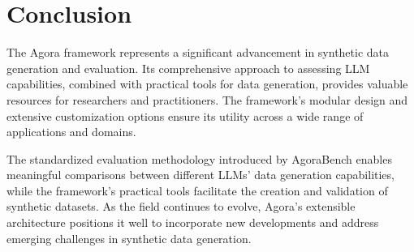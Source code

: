 \documentclass[10pt,conference]{IEEEtran}
\begin{document}
\section{Conclusion}
The Agora framework represents a significant advancement in synthetic data generation and evaluation. Its comprehensive approach to assessing LLM capabilities, combined with practical tools for data generation, provides valuable resources for researchers and practitioners. The framework's modular design and extensive customization options ensure its utility across a wide range of applications and domains.

The standardized evaluation methodology introduced by AgoraBench enables meaningful comparisons between different LLMs' data generation capabilities, while the framework's practical tools facilitate the creation and validation of synthetic datasets. As the field continues to evolve, Agora's extensible architecture positions it well to incorporate new developments and address emerging challenges in synthetic data generation.
\end{document}
